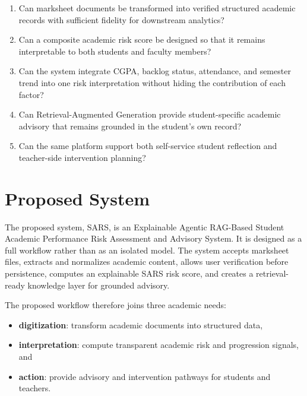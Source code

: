\begin{enumerate}[leftmargin=*]
\item Can marksheet documents be transformed into verified structured academic records with sufficient fidelity for downstream analytics?
\item Can a composite academic risk score be designed so that it remains interpretable to both students and faculty members?
\item Can the system integrate CGPA, backlog status, attendance, and semester trend into one risk interpretation without hiding the contribution of each factor?
\item Can Retrieval-Augmented Generation provide student-specific academic advisory that remains grounded in the student's own record?
\item Can the same platform support both self-service student reflection and teacher-side intervention planning?
\end{enumerate}

\section{Proposed System}
The proposed system, SARS, is an Explainable Agentic RAG-Based Student Academic Performance Risk Assessment and Advisory System. It is designed as a full workflow rather than as an isolated model. The system accepts marksheet files, extracts and normalizes academic content, allows user verification before persistence, computes an explainable SARS risk score, and creates a retrieval-ready knowledge layer for grounded advisory.

The proposed workflow therefore joins three academic needs:
\begin{itemize}[leftmargin=*]
\item \textbf{digitization}: transform academic documents into structured data,
\item \textbf{interpretation}: compute transparent academic risk and progression signals, and
\item \textbf{action}: provide advisory and intervention pathways for students and teachers.
\end{itemize}

